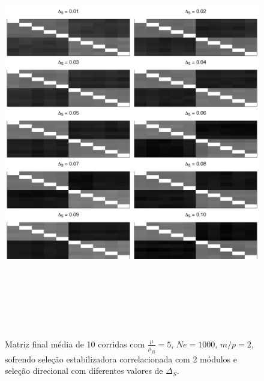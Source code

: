 \documentclass[a4paper, 12pt, titlepage, onecolumn]{article}
\numberwithin{equation}{section}
\numberwithin{table}{section}
\begin{document}
\begin{center}
\begin{figure}[H]
  \includegraphics[width=150mm, height=180mm]{figuras/MatBDirecionalIntSel110}
   \caption{Matriz final média de 10 corridas com
   $\frac{\mu}{\mu_B} = 5$, $Ne = 1000$, $m/p=2$, sofrendo seleção estabilizadora correlacionada com 2
   módulos e seleção direcional com diferentes valores de $\Delta_S$.}
  \label{MatBIntSel110}
\end{figure}
\end{center}
\end{document}
